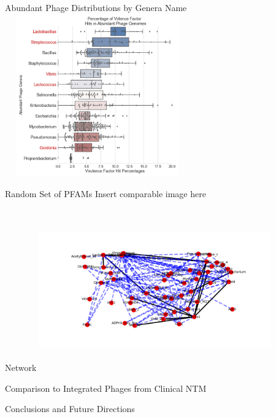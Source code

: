 \documentclass[11pt, xcolor=table]{beamer}
\begin{document}
	\begin{frame}{Abundant Phage Distributions by Genera Name}
	\centering
	\includegraphics[height=7cm, width=8cm]{Top_Phages_Plots.jpg}
	
	\end{frame}
	\begin{frame}{Random Set of PFAMs}
	Insert comparable image here
	\end{frame}
	\begin{frame}{Network}
	\center
	\includegraphics[height=7cm, width=10cm]{CPBS_11_18/weighted_graph.png}
	\end{frame}
	\begin{frame}{Comparison to Integrated Phages from Clinical NTM}

	\end{frame}
	\begin{frame}{Conclusions and Future Directions}
	
	\end{frame}
	
\end{document}
